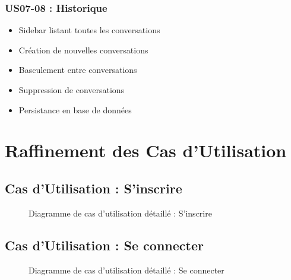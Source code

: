 \subsubsection{US07-08 : Historique}

\begin{itemize}
    \item Sidebar listant toutes les conversations
    \item Création de nouvelles conversations
    \item Basculement entre conversations
    \item Suppression de conversations
    \item Persistance en base de données
\end{itemize}

\section{Raffinement des Cas d'Utilisation}

\subsection{Cas d'Utilisation : S'inscrire}

\begin{figure}[H]
    \centering
    \caption{Diagramme de cas d'utilisation détaillé : S'inscrire}
    \label{fig:uc-inscription}
\end{figure}

\subsection{Cas d'Utilisation : Se connecter}

\begin{figure}[H]
    \centering
    \caption{Diagramme de cas d'utilisation détaillé : Se connecter}
    \label{fig:uc-connexion}
\end{figure}


